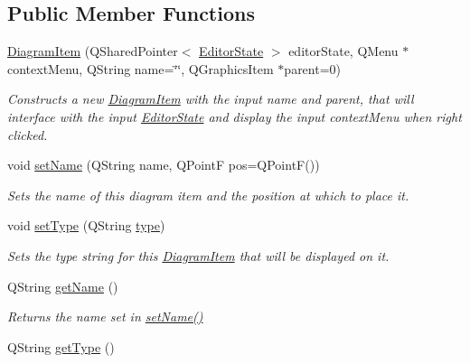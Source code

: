 \subsection*{Public Member Functions}
\begin{DoxyCompactItemize}
\item 
\hyperlink{class_diagram_item_a87352dd82a5057ecd67c3728fb4f4c6f}{Diagram\-Item} (Q\-Shared\-Pointer$<$ \hyperlink{class_editor_state}{Editor\-State} $>$ editor\-State, Q\-Menu $\ast$context\-Menu, Q\-String name=\char`\"{}\char`\"{}, Q\-Graphics\-Item $\ast$parent=0)
\begin{DoxyCompactList}\small\item\em Constructs a new \hyperlink{class_diagram_item}{Diagram\-Item} with the input name and parent, that will interface with the input \hyperlink{class_editor_state}{Editor\-State} and display the input context\-Menu when right clicked. \end{DoxyCompactList}\item 
void \hyperlink{class_diagram_item_ae1363bc6b79c0f9e0dc5e4c1dc90cb51}{set\-Name} (Q\-String name, Q\-Point\-F pos=Q\-Point\-F())
\begin{DoxyCompactList}\small\item\em Sets the name of this diagram item and the position at which to place it. \end{DoxyCompactList}\item 
\hypertarget{class_diagram_item_a923ea9e62ea16ded388877e9681fe9e3}{void \hyperlink{class_diagram_item_a923ea9e62ea16ded388877e9681fe9e3}{set\-Type} (Q\-String \hyperlink{class_diagram_item_a4851c7c4ea5fbb3e137c074082ebf84b}{type})}\label{class_diagram_item_a923ea9e62ea16ded388877e9681fe9e3}

\begin{DoxyCompactList}\small\item\em Sets the type string for this \hyperlink{class_diagram_item}{Diagram\-Item} that will be displayed on it. \end{DoxyCompactList}\item 
\hypertarget{class_diagram_item_a4f2798521e959e28d070a9fd5d8ed846}{Q\-String \hyperlink{class_diagram_item_a4f2798521e959e28d070a9fd5d8ed846}{get\-Name} ()}\label{class_diagram_item_a4f2798521e959e28d070a9fd5d8ed846}

\begin{DoxyCompactList}\small\item\em Returns the name set in \hyperlink{class_diagram_item_ae1363bc6b79c0f9e0dc5e4c1dc90cb51}{set\-Name()} \end{DoxyCompactList}\item 
\hypertarget{class_diagram_item_a4315085beb6794bba247b0c181dd486d}{Q\-String \hyperlink{class_diagram_item_a4315085beb6794bba247b0c181dd486d}{get\-Type} ()}\label{class_diagram_item_a4315085beb6794bba247b0c181dd486d}


\end{DoxyCompactItemize}
